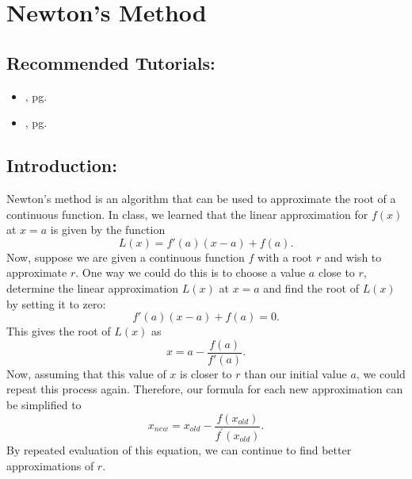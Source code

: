 \section{Newton's Method}
\label{sec:newtons_method}

\subsection*{Recommended Tutorials:}
\begin{itemize}[noitemsep]
	\item {}, pg. \pageref{chp:derivative}
	\item {}, pg. \pageref{chp:conditional_statements_and_loops}
\end{itemize}

\subsection*{Introduction:}

Newton's method is an algorithm that can be used to approximate the root of a continuous function. In class, we learned that the linear approximation for $f(x)$ at $x=a$ is given by the function
\[ L(x) = f'(a) (x-a) + f(a). \] 
Now, suppose we are given a continuous function $f$ with a root $r$ and wish to approximate $r$. One way we could do this is to choose a value $a$ close to $r$, determine the linear approximation $L(x)$ at $x=a$ and find the root of $L(x)$ by setting it to zero:
\[ f'(a) (x-a) + f(a) = 0 .\]
This gives the root of $L(x)$ as
\[ x = a - \frac{f(a)}{f'(a)}. \]
Now, assuming that this value of $x$ is closer to $r$ than our initial value $a$, we could repeat this process again. Therefore, our formula for each new approximation can be simplified to \[x_{new} = x_{old} - \dfrac{f(x_{old})}{f^{\prime}(x_{old})}.\]  By repeated evaluation of this equation, we can continue to find better approximations of $r$.

